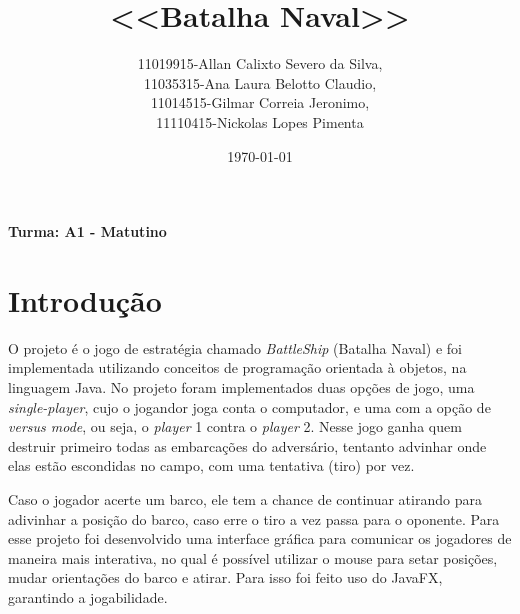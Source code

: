 \documentclass[]{article}
\title{<<Batalha Naval>>}
\author{11019915-Allan Calixto Severo da Silva,\\
11035315-Ana Laura Belotto Claudio,\\
11014515-Gilmar Correia Jeronimo,\\
11110415-Nickolas Lopes Pimenta}
\date{\today}
\begin{document}
\maketitle

\centerline{\textbf{Turma: A1 - Matutino}}

\section{Introdução}
O projeto é o jogo de estratégia chamado \textit{BattleShip} (Batalha Naval) e foi implementada utilizando conceitos de programação orientada à objetos, na linguagem Java. No projeto foram implementados duas opções de jogo, uma \textit{single-player}, cujo o jogandor joga conta o computador, e uma com a opção de \textit{versus  mode}, ou seja, o \textit{player} 1 contra o \textit{player} 2. Nesse jogo ganha quem destruir primeiro todas as embarcações do adversário, tentanto advinhar onde elas estão escondidas no campo, com uma tentativa (tiro) por vez.

Caso o jogador acerte um barco, ele tem a chance de continuar atirando para adivinhar a posição do barco, caso erre o tiro a vez passa para o oponente. Para esse projeto foi desenvolvido uma interface gráfica para comunicar os jogadores de maneira mais interativa, no qual é possível utilizar o mouse para setar posições, mudar orientações do barco e atirar. Para isso foi feito uso do JavaFX, garantindo a jogabilidade. 
\end{document}
